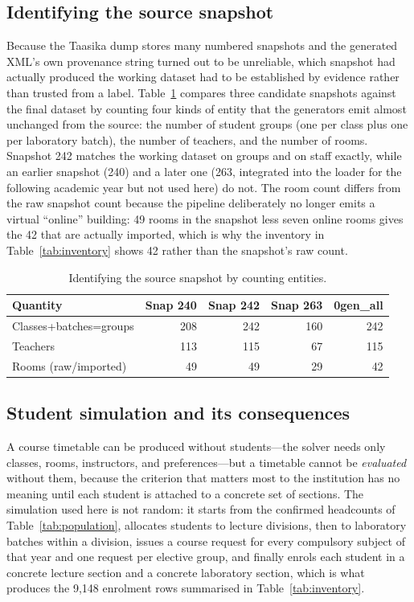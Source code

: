 \documentclass[journal]{IEEEtran}
\begin{document}
\subsection{Identifying the source snapshot}
Because the Taasika dump stores many numbered snapshots and the generated XML's own provenance string turned out to be unreliable, which snapshot had actually produced the working dataset had to be established by evidence rather than trusted from a label. Table~\ref{tab:snapshot} compares three candidate snapshots against the final dataset by counting four kinds of entity that the generators emit almost unchanged from the source: the number of student groups (one per class plus one per laboratory batch), the number of teachers, and the number of rooms. Snapshot 242 matches the working dataset on groups and on staff exactly, while an earlier snapshot (240) and a later one (263, integrated into the loader for the following academic year but not used here) do not. The room count differs from the raw snapshot count because the pipeline deliberately no longer emits a virtual ``online'' building: 49 rooms in the snapshot less seven online rooms gives the 42 that are actually imported, which is why the inventory in Table~\ref{tab:inventory} shows 42 rather than the snapshot's raw count.

\begin{table}[t]
\centering
\caption{Identifying the source snapshot by counting entities.}
\label{tab:snapshot}
\scriptsize
\begin{tabular}{@{}lrrrr@{}}
\toprule
Quantity & Snap 240 & Snap 242 & Snap 263 & 0gen\_all \\
\midrule
Classes+batches=groups & 208 & 242 & 160 & 242 \\
Teachers & 113 & 115 & 67 & 115 \\
Rooms (raw/imported) & 49 & 49 & 29 & 42 \\
\bottomrule
\end{tabular}
\end{table}

\subsection{Student simulation and its consequences}
A course timetable can be produced without students---the solver needs only classes, rooms, instructors, and preferences---but a timetable cannot be \emph{evaluated} without them, because the criterion that matters most to the institution has no meaning until each student is attached to a concrete set of sections. The simulation used here is not random: it starts from the confirmed headcounts of Table~\ref{tab:population}, allocates students to lecture divisions, then to laboratory batches within a division, issues a course request for every compulsory subject of that year and one request per elective group, and finally enrols each student in a concrete lecture section and a concrete laboratory section, which is what produces the 9{,}148 enrolment rows summarised in Table~\ref{tab:inventory}.
\end{document}
